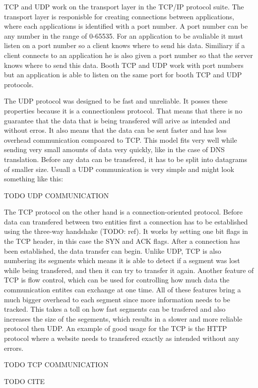TCP and UDP work on the transport layer in the TCP/IP protocol suite. The transport layer is responisble for creating connections between applications, where each applications is identified with a port number. A port number can be any number in the range of 0-65535. For an application to be avaliable it must listen on a port number so a client knows where to send his data. Similiary if a client connects to an application he is also given a port number so that the server knows where to send this data. Booth TCP and UDP work with port numbers but an application is able to listen on the same port for booth TCP and UDP protocols.

The UDP protocol was designed to be fast and unreliable. It posses these properties because it is a connectionless protocol. That means that there is no guarantee that the data that is being transfered will arive as intended and without erros. It also means that the data can be sent faster and has less overhead communication compoared to TCP. This model fits very well while sending very small amounts of data very quickly, like in the case of DNS translation. Before any data can be transfered, it has to be split into datagrams of smaller size. Usuall a UDP communication is very simple and might look something like this:

TODO UDP COMMUNICATION

The TCP protocol on the other hand is a connection-oriented protocol. Before data can transfered between two entities first a connection has to be established using the three-way handshake (TODO: ref). It works by setting one bit flags in the TCP header, in this case the SYN and ACK flags. After a connection has been established, the data transfer can begin. Unlike UDP, TCP is also numbering its segments which means it is able to detect if a segment was lost while being transfered, and then it can try to transfer it again. Another feature of TCP is flow control, which can be used for controlling how much data the communication entites can exchange at one time. All of these features bring a much bigger overhead to each segment since more information needs to be tracked. This takes a toll on how fast segments can be trasfered and also increases the size of the segements, which results in a slower and more reliable protocol then UDP. An example of good usage for the TCP is the HTTP protocol where a website needs to transfered exactly as intended without any errors.

TODO TCP COMMUNICATION

TODO CITE
